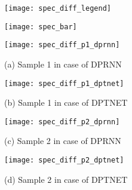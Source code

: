 \begin{figure*}[!t]
\centering
  \begin{minipage}[b]{0.42\linewidth}
    \centering
    \texttt{[image: spec\_diff\_legend]}
  \end{minipage}
  \hspace{0.05\linewidth}
  \begin{minipage}[b]{0.42\linewidth}
    \centering
    \texttt{[image: spec\_bar]}
  \end{minipage}
  \begin{minipage}[b]{0.42\linewidth}
    \centering
    \texttt{[image: spec\_diff\_p1\_dprnn]}
    \centerline{(a) Sample 1 in case of DPRNN}\medskip
  \end{minipage}
  \hspace{0.05\linewidth}
  \begin{minipage}[b]{0.42\linewidth}
    \centering
    \texttt{[image: spec\_diff\_p1\_dptnet]}
    \centerline{(b) Sample 1 in case of DPTNET}\medskip
  \end{minipage}
  \begin{minipage}[b]{0.42\linewidth}
    \centering
    \texttt{[image: spec\_diff\_p2\_dprnn]}
    \centerline{(c) Sample 2 in case of DPRNN}\medskip
  \end{minipage}
  \hspace{0.05\linewidth}
  \begin{minipage}[b]{0.42\linewidth}
    \centering
    \texttt{[image: spec\_diff\_p2\_dptnet]}
    \centerline{(d) Sample 2 in case of DPTNET}\medskip
  \end{minipage}
  \caption{}
  \label{fig:real_examples_diff}
\end{figure*}

